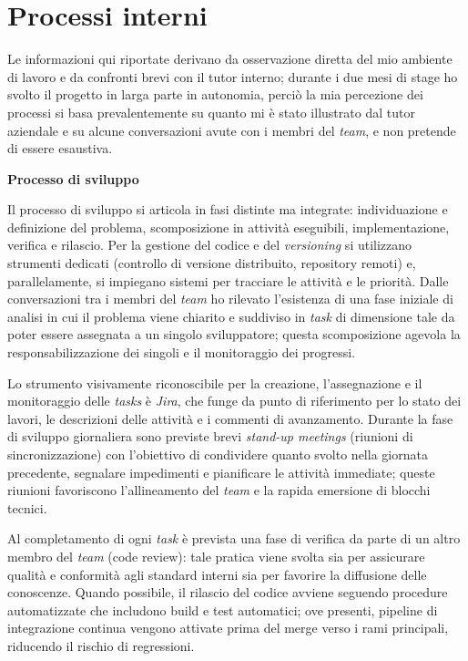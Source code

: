 \section{Processi interni}

Le informazioni qui riportate derivano da osservazione diretta del mio ambiente di lavoro e da confronti brevi con il tutor interno; 
durante i due mesi di stage ho svolto il progetto in larga parte in autonomia, perciò la mia percezione dei processi si basa prevalentemente su quanto mi è stato illustrato dal tutor aziendale 
e su alcune conversazioni avute con i membri del \emph{team}, e non pretende di essere esaustiva.

\medskip
\noindent\textbf{Processo di sviluppo}

Il processo di sviluppo si articola in fasi distinte ma integrate: individuazione e definizione del problema, 
scomposizione in attività eseguibili, implementazione, verifica e rilascio. 
Per la gestione del codice e del \emph{versioning} si utilizzano strumenti dedicati (controllo di versione distribuito, repository remoti) e, 
parallelamente, si impiegano sistemi per tracciare le attività e le priorità. Dalle conversazioni tra i membri del \emph{team} ho rilevato l’esistenza di una fase iniziale di 
analisi in cui il problema viene chiarito e suddiviso in \emph{task} di dimensione tale da poter essere assegnata a un singolo sviluppatore; questa scomposizione agevola la 
responsabilizzazione dei singoli e il monitoraggio dei progressi.

Lo strumento visivamente riconoscibile per la creazione, 
l’assegnazione e il monitoraggio delle \emph{tasks} è \emph{Jira}, che funge da punto di riferimento per lo stato dei lavori, le descrizioni delle attività e i commenti di avanzamento. 
Durante la fase di sviluppo giornaliera sono previste brevi \emph{stand-up meetings} (riunioni di sincronizzazione) con l’obiettivo di condividere quanto svolto nella giornata precedente, 
segnalare impedimenti e pianificare le attività immediate; queste riunioni favoriscono l’allineamento del \emph{team} e la rapida emersione di blocchi tecnici.

Al completamento di ogni \emph{task} è prevista una fase di verifica da parte di un altro membro del \emph{team} (code review): 
tale pratica viene svolta sia per assicurare qualità e conformità agli standard interni sia per favorire la diffusione delle conoscenze. 
Quando possibile, il rilascio del codice avviene seguendo procedure automatizzate che includono build e test automatici; ove presenti, 
pipeline di integrazione continua vengono attivate prima del merge verso i rami principali, riducendo il rischio di regressioni.

